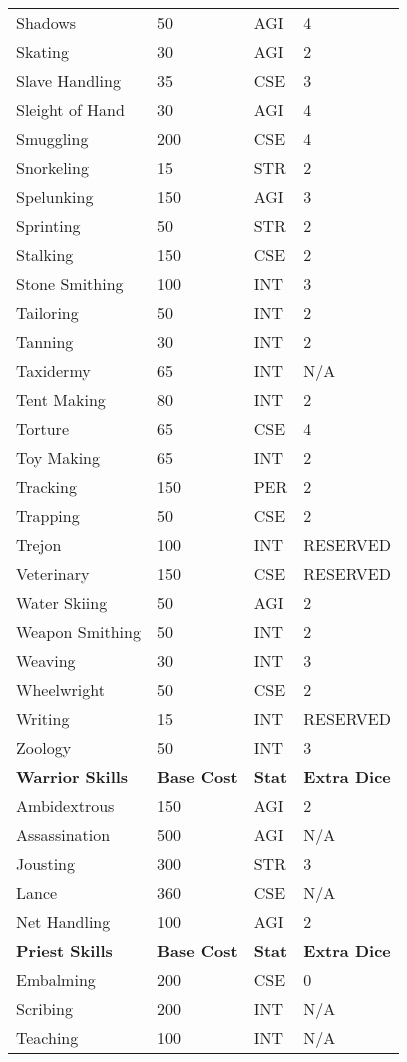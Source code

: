 \begin{multicols*}{2}
\begin{tcolorbox}[breakable,boxrule=0pt]
\begin{xtabular}{l l l l}
Shadows & 50 & AGI & 4 \\
Skating & 30 & AGI & 2 \\
Slave Handling & 35 & CSE & 3 \\
Sleight of Hand & 30 & AGI & 4 \\
Smuggling & 200 & CSE & 4 \\
Snorkeling & 15 & STR & 2 \\
Spelunking & 150 & AGI & 3 \\
Sprinting & 50 & STR & 2 \\
Stalking & 150 & CSE & 2 \\
Stone Smithing & 100 & INT & 3 \\
Tailoring & 50 & INT & 2 \\
Tanning & 30 & INT & 2 \\
Taxidermy & 65 & INT & N/A \\
Tent Making & 80 & INT & 2 \\
Torture & 65 & CSE & 4 \\
Toy Making & 65 & INT & 2 \\
Tracking & 150 & PER & 2 \\
Trapping & 50 & CSE & 2 \\
Trejon & 100 & INT & RESERVED \\
Veterinary & 150 & CSE & RESERVED \\
Water Skiing & 50 & AGI & 2 \\
Weapon Smithing & 50 & INT & 2 \\
Weaving & 30 & INT & 3 \\
Wheelwright & 50 & CSE & 2 \\
Writing & 15 & INT & RESERVED \\
Zoology & 50 & INT & 3 \\
\midrule
\textbf{Warrior Skills} & \textbf{Base Cost} & \textbf{Stat} & \textbf{Extra Dice}\\
Ambidextrous & 150 & AGI & 2 \\
Assassination & 500 & AGI & N/A \\
Jousting & 300 & STR & 3 \\
Lance & 360 & CSE & N/A \\
Net Handling & 100 & AGI & 2 \\
\midrule
\textbf{Priest Skills} & \textbf{Base Cost} & \textbf{Stat} & \textbf{Extra Dice}\\
Embalming & 200 & CSE & 0 \\
Scribing & 200 & INT & N/A \\
Teaching & 100 & INT & N/A \\

\end{xtabular}
\end{tcolorbox}
\end{multicols*}
